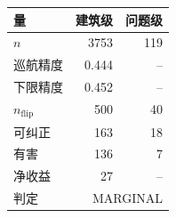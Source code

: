 \begin{tabular}{lrr}
\hline
量 & 建筑级 & 问题级 \\
\hline
$n$ & 3753 & 119 \\
巡航精度 & 0.444 & -- \\
下限精度 & 0.452 & -- \\
$n_{\mathrm{flip}}$ & 500 & 40 \\
可纠正 & 163 & 18 \\
有害 & 136 & 7 \\
净收益 & 27 & -- \\
判定 & \multicolumn{2}{r}{MARGINAL} \\
\hline
\end{tabular}
